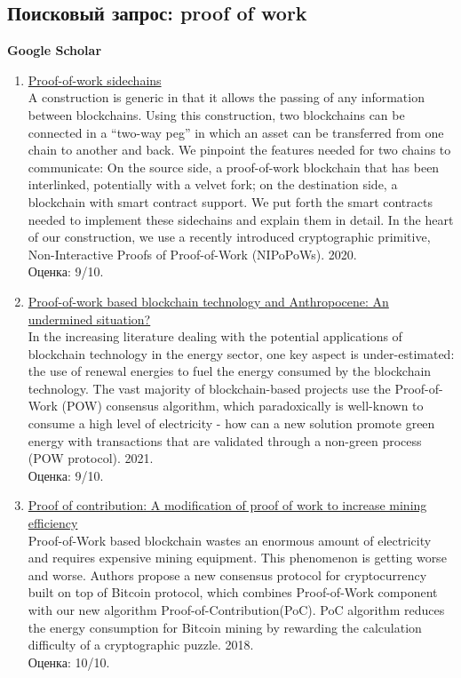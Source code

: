 \documentclass[a4paper, 12pt]{report}		%
\begin{document}
\subsection*{Поисковый запрос: proof of work}

\textbf{Google Scholar}

\begin{enumerate}
\item \href{https://link.springer.com/chapter/10.1007/978-3-030-43725-1_3}{Proof-of-work sidechains}\\
A construction is generic in that it allows the passing of any information between blockchains. Using this construction, two blockchains can be connected in a “two-way peg” in which an asset can be transferred from one chain to another and back. We pinpoint the features needed for two chains to communicate: On the source side, a proof-of-work blockchain that has been interlinked, potentially with a velvet fork; on the destination side, a blockchain with smart contract support. We put forth the smart contracts needed to implement these sidechains and explain them in detail. In the heart of our construction, we use a recently introduced cryptographic primitive, Non-Interactive Proofs of Proof-of-Work (NIPoPoWs). 2020.\\
Оценка: 9/10.
\item \href{https://www.sciencedirect.com/science/article/abs/pii/S1364032121009564}{Proof-of-work based blockchain technology and Anthropocene: An undermined situation?}\\
In the increasing literature dealing with the potential applications of blockchain technology in the energy sector, one key aspect is under-estimated: the use of renewal energies to fuel the energy consumed by the blockchain technology. The vast majority of blockchain-based projects use the Proof-of-Work (POW) consensus algorithm, which paradoxically is well-known to consume a high level of electricity - how can a new solution promote green energy with transactions that are validated through a non-green process (POW protocol). 2021.\\
Оценка: 9/10.
\item \href{https://ieeexplore.ieee.org/abstract/document/8377721}{Proof of contribution: A modification of proof of work to increase mining efficiency}\\
Proof-of-Work based blockchain wastes an enormous amount of electricity and requires expensive mining equipment. This phenomenon is getting worse and worse. Authors propose a new consensus protocol for cryptocurrency built on top of Bitcoin protocol, which combines Proof-of-Work component with our new algorithm Proof-of-Contribution(PoC). PoC algorithm reduces the energy consumption for Bitcoin mining by rewarding the calculation difficulty of a cryptographic puzzle. 2018.\\
Оценка: 10/10.
\end{enumerate}
\end{document}
